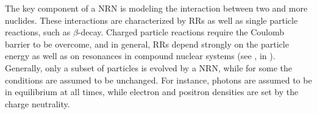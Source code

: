 The key component of a \ac{NRN} is modeling the interaction between two and more nuclides. 
These interactions are characterized by \acp{RR} as well as single particle reactions, such as $\beta$-decay.
Charged particle reactions require the Coulomb barrier to be overcome, 
and in general, \acp{RR} depend strongly on the particle energy as well as on 
resonances in compound nuclear systems (see \eg,  in \citet{Clayton:1968}). 
%
%
%
%
Generally, only a subset of particles is evolved by a \ac{NRN}, while for some the conditions 
are assumed to be unchanged. For instance, photons are assumed to be in equilibrium at all 
times, while electron and positron densities are set by the charge neutrality. 

